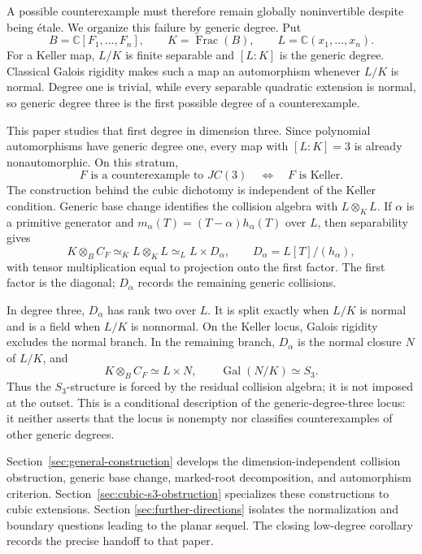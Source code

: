 \documentclass[11pt]{article}
\theoremstyle{remark}
\theoremstyle{definition}
\DeclareMathOperator{\Frac}{Frac}
\DeclareMathOperator{\Gal}{Gal}
\newcommand{\C}{\mathbb C}
\begin{document}
A possible counterexample must therefore remain globally noninvertible
despite being \'etale.  We organize this failure by generic degree.  Put
\[
  B=\C[F_1,\dots,F_n],\qquad
  K=\Frac(B),\qquad
  L=\C(x_1,\dots,x_n).
\]
For a Keller map, \(L/K\) is finite separable and \([L:K]\) is the
generic degree.  Classical Galois rigidity makes such a map an automorphism
whenever \(L/K\) is normal.  Degree one is trivial, while every separable
quadratic extension is normal, so generic degree three is the first possible
degree of a counterexample.

This paper studies that first degree in dimension three.  Since polynomial
automorphisms have generic degree one, every map with \([L:K]=3\) is already
nonautomorphic.  On this stratum,
\[
  F\text{ is a counterexample to }JC(3)
  \quad\Longleftrightarrow\quad
  F\text{ is Keller}.
\]
The construction behind the cubic dichotomy is independent of the Keller
condition.  Generic base change identifies the collision algebra with
\(L\otimes_KL\).  If \(\alpha\) is a primitive generator and
\(m_\alpha(T)=(T-\alpha)h_\alpha(T)\) over \(L\), then separability gives
\[
  K\otimes_BC_F
  \simeq_K L\otimes_KL
  \simeq_L L\times D_\alpha,
  \qquad
  D_\alpha=L[T]/(h_\alpha),
\]
with tensor multiplication equal to projection onto the first factor.  The
first factor is the diagonal; \(D_\alpha\) records the remaining generic
collisions.

In degree three, \(D_\alpha\) has rank two over \(L\).  It is split exactly
when \(L/K\) is normal and is a field when \(L/K\) is nonnormal.  On the
Keller locus, Galois rigidity excludes the normal branch.  In the remaining
branch, \(D_\alpha\) is the normal closure \(N\) of \(L/K\), and
\[
  K\otimes_BC_F\simeq L\times N,
  \qquad
  \Gal(N/K)\simeq S_3.
\]
Thus the \(S_3\)-structure is forced by the residual collision algebra; it
is not imposed at the outset.  This is a conditional description of the
generic-degree-three locus: it neither asserts that the locus is nonempty
nor classifies counterexamples of other generic degrees.

Section~\ref{sec:general-construction} develops the dimension-independent
collision obstruction, generic base change, marked-root decomposition, and
automorphism criterion.  Section~\ref{sec:cubic-s3-obstruction} specializes
these constructions to cubic extensions.  Section
\ref{sec:further-directions} isolates the normalization and boundary
questions leading to the planar sequel.  The closing low-degree corollary
records the precise handoff to that paper.
\end{document}
